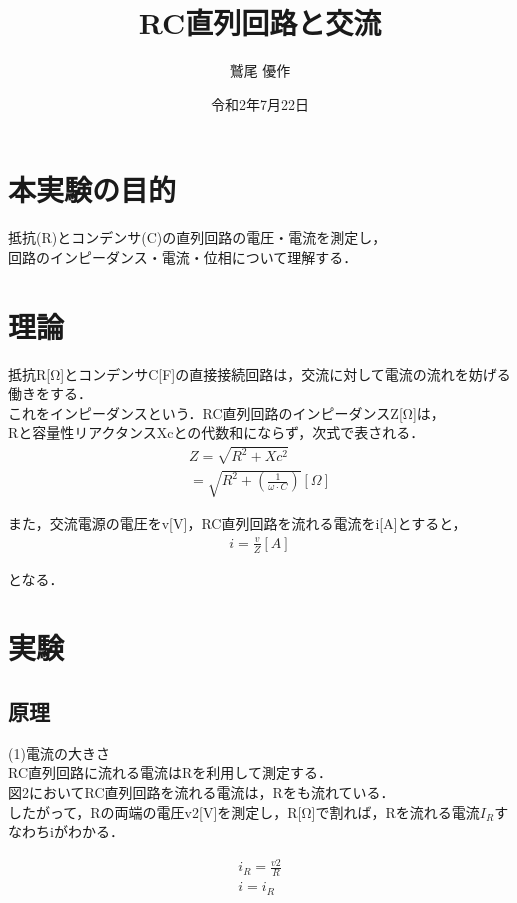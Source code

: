 \documentclass[titlepage]{jarticle}
\title{RC直列回路と交流}
\author{鷲尾 優作}
\date{令和2年7月22日}
\begin{document}
\maketitle

\section{本実験の目的}
抵抗(R)とコンデンサ(C)の直列回路の電圧・電流を測定し，\\回路のインピーダンス・電流・位相について理解する．
\section{理論}
抵抗R[Ω]とコンデンサC[F]の直接接続回路は，交流に対して電流の流れを妨げる働きをする．\\
これをインピーダンスという．RC直列回路のインピーダンスZ[Ω]は，\\
Rと容量性リアクタンスXcとの代数和にならず，次式で表される．\\
\begin{eqnarray}
    Z=\sqrt{R^2+Xc^2} \nonumber \\
    =\sqrt{R^2+(\frac{1}{\omega \cdot C})} [Ω]
\end{eqnarray}

また，交流電源の電圧をv[V]，RC直列回路を流れる電流をi[A]とすると，\\
\begin{eqnarray}
    i=\frac{v}{Z} [A]
\end{eqnarray}

となる．

\section{実験}
\subsection{原理}
(1)電流の大きさ\\
RC直列回路に流れる電流はRを利用して測定する．\\図2においてRC直列回路を流れる電流は，Rをも流れている．\\
したがって，Rの両端の電圧v2[V]を測定し，R[Ω]で割れば，Rを流れる電流$I_R$すなわちiがわかる．

\begin{eqnarray}
    i_R=\frac{v2}{R}\\
    i=i_R\nonumber
\end{eqnarray}
\end{document}
